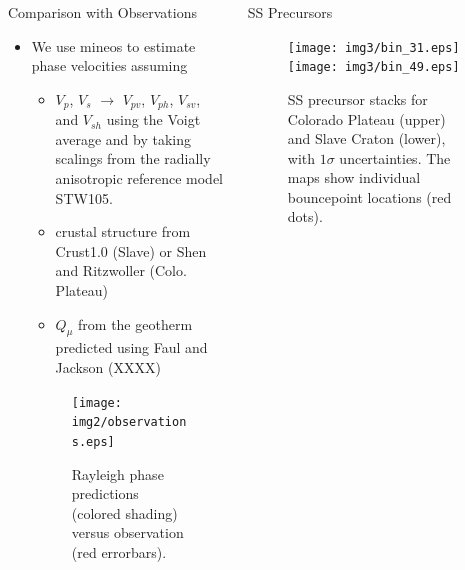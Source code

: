 \documentclass[final]{beamer}
\newlength{\onecolwid}
\newlength{\twocolwid}
\begin{document}
\begin{frame}[t]
\begin{columns}[t]
\begin{column}{\twocolwid}
\begin{columns}[t,totalwidth=\twocolwid]
\begin{column}{\onecolwid}
\begin{alertblock}{Comparison with Observations}
\begin{itemize}

\item We use mineos to estimate phase velocities assuming

\begin{itemize}

\item $V_{p}$, $V_{s}$ $\rightarrow$ $V_{pv}$, $V_{ph}$, $V_{sv}$, and $V_{sh}$ using the Voigt average and by taking scalings from the radially anisotropic reference model STW105.
\item crustal structure from Crust1.0 (Slave) or Shen and Ritzwoller (Colo. Plateau)
\item $Q_\mu$ from the geotherm predicted using Faul and Jackson (XXXX)

\end{itemize}

\begin{figure}
\texttt{[image: img2/observations.eps]}
\caption{Rayleigh phase predictions (colored shading) versus observation (red errorbars).}
\end{figure}

\end{itemize}

\end{alertblock}


\end{column} %

\begin{column}{\onecolwid} %


\begin{block}{SS Precursors}

\begin{figure}
\texttt{[image: img3/bin\_31.eps]} \\
\texttt{[image: img3/bin\_49.eps]}
\caption{SS precursor stacks for Colorado Plateau (upper) and Slave Craton (lower), with $1\sigma$ uncertainties.  The maps show individual bouncepoint locations (red dots). }
\end{figure}


\end{block}
\end{column}
\end{columns}
\end{column}
\end{columns}
\end{frame}
\end{document}
